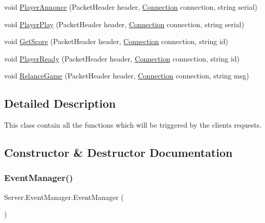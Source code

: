 \begin{DoxyCompactItemize}
\item 
void \hyperlink{class_server_1_1_event_manager_a6ebf5baf3a5876a576dc01e8ff49e394}{Player\+Annonce} (Packet\+Header header, \hyperlink{class_server_1_1_event_manager_a3159a84121b61e97716c80eed301d03b}{Connection} connection, string serial)
\item 
void \hyperlink{class_server_1_1_event_manager_aff9aa8a96eaa4c7d455ca0667dd7bf7d}{Player\+Play} (Packet\+Header header, \hyperlink{class_server_1_1_event_manager_a3159a84121b61e97716c80eed301d03b}{Connection} connection, string serial)
\item 
void \hyperlink{class_server_1_1_event_manager_a8c0e262490d85c41247c2ba333351141}{Get\+Score} (Packet\+Header header, \hyperlink{class_server_1_1_event_manager_a3159a84121b61e97716c80eed301d03b}{Connection} connection, string id)
\item 
void \hyperlink{class_server_1_1_event_manager_aed28cbd06bcd73e9bc8ad8636dc19d7b}{Player\+Ready} (Packet\+Header header, \hyperlink{class_server_1_1_event_manager_a3159a84121b61e97716c80eed301d03b}{Connection} connection, string id)
\item 
void \hyperlink{class_server_1_1_event_manager_a41e2ae8f1ce010a1a7db39b27fa65aaf}{Relance\+Game} (Packet\+Header header, \hyperlink{class_server_1_1_event_manager_a3159a84121b61e97716c80eed301d03b}{Connection} connection, string msg)
\end{DoxyCompactItemize}


\subsection{Detailed Description}
This class contain all the functions which will be triggered by the client\textquotesingle{}s requests. 

\subsection{Constructor \& Destructor Documentation}
\mbox{\label{class_server_1_1_event_manager_a6d3c4760909d6aea6f5f8b1049fc4d4b}} 
\subsubsection{\texorpdfstring{Event\+Manager()}{EventManager()}}
{\footnotesize\ttfamily Server.\+Event\+Manager.\+Event\+Manager (\begin{DoxyParamCaption}{ }\end{DoxyParamCaption})\hspace{0.3cm}{\ttfamily [inline]}}


